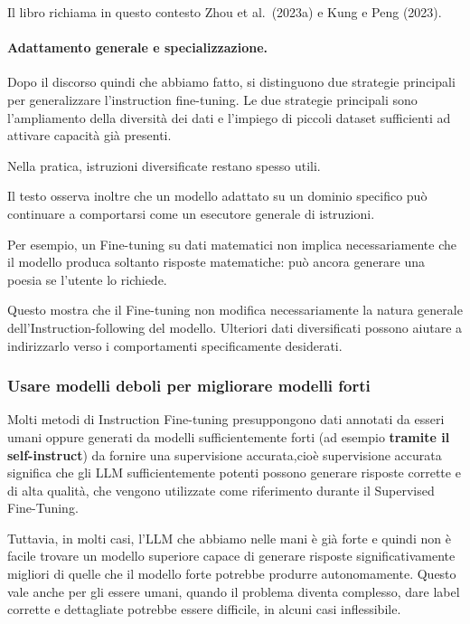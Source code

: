 Il libro richiama in questo contesto
Zhou et al.\ (2023a) e Kung e Peng (2023).

\paragraph{Adattamento generale e specializzazione.}
Dopo il discorso quindi che abbiamo fatto, si distinguono due strategie principali per generalizzare l'instruction fine-tuning.
Le due strategie principali sono
l'ampliamento della diversità dei dati
e l'impiego di piccoli dataset sufficienti
ad attivare capacità già presenti.

Nella pratica, istruzioni diversificate
restano spesso utili.

Il testo osserva inoltre che un modello
adattato su un dominio specifico
può continuare a comportarsi come
un esecutore generale di istruzioni.

Per esempio, un Fine-tuning su dati matematici
non implica necessariamente che il modello
produca soltanto risposte matematiche:
può ancora generare una poesia
se l'utente lo richiede.

Questo mostra che il Fine-tuning
non modifica necessariamente la natura generale
dell'Instruction-following del modello.
Ulteriori dati diversificati possono aiutare
a indirizzarlo verso i comportamenti
specificamente desiderati.

\newpage

\subsubsection{Usare modelli deboli per migliorare modelli forti}

Molti metodi di Instruction Fine-tuning
presuppongono dati annotati da esseri umani
oppure generati da modelli sufficientemente forti (ad esempio \textbf{tramite il self-instruct})
da fornire una supervisione accurata,cioè supervisione accurata significa che gli LLM sufficientemente potenti possono generare risposte corrette e di alta qualità, che vengono utilizzate come riferimento durante il Supervised Fine-Tuning.



Tuttavia, in molti casi, l'LLM che abbiamo nelle mani è già forte e quindi non è facile trovare un modello superiore capace di generare risposte significativamente migliori di quelle che il modello forte potrebbe produrre autonomamente.
Questo vale anche per gli essere umani, quando il problema diventa complesso, dare label corrette e dettagliate potrebbe essere difficile, in alcuni casi inflessibile.


